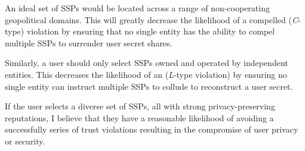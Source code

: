\begin{packed_desc}
\item[Geopolitical Diversity:] An ideal set of SSPs would be located
  across a range of non-cooperating geopolitical domains. This will
  greatly decrease the likelihood of a compelled (\emph{C}-type)
  violation by ensuring that no single entity has the ability to
  compel multiple SSPs to surrender user secret shares.
\item[Ownership Diversity:] Similarly, a user should only select SSPs
  owned and operated by independent entities. This decreases the
  likelihood of an (\emph{L}-type violation) by ensuring no single
  entity can instruct multiple SSPs to collude to reconstruct a user
  secret.
\end{packed_desc}

If the user selects a diverse set of SSPs, all with strong
privacy-preserving reputations, I believe that they have a reasonable
likelihood of avoiding a successfully series of trust violations
resulting in the compromise of user privacy or security.

